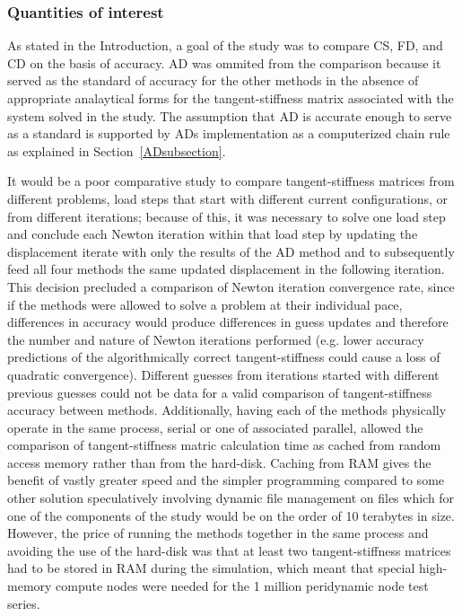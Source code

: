 \documentclass[preprint,12pt]{elsarticle}
\begin{document}
\subsubsection{Quantities of interest} 
\label{JGAM} 
As stated in the Introduction, a goal of the study was to compare CS, FD, and CD on the basis of accuracy. AD was ommited from the comparison because it served as the standard of accuracy for the other methods in the absence of appropriate analaytical forms for the tangent-stiffness matrix associated with the system solved in the study. The assumption that AD is accurate enough to serve as a standard is supported by ADs implementation as a computerized chain rule as explained in Section~\ref{ADsubsection}.

It would be a poor comparative study to compare tangent-stiffness matrices from different problems, load steps that start with different current configurations, or from different iterations; because of this, it was necessary to solve one
load step and conclude each Newton iteration within that load step by updating the displacement iterate with only the results of the AD method and to subsequently feed all four methods the same updated displacement in the following iteration. This decision precluded a comparison of Newton iteration convergence rate, since if the methods were allowed to solve a problem at their individual pace, differences in accuracy would produce differences in guess updates and therefore the number and nature of Newton iterations performed (e.g. lower accuracy predictions of the algorithmically correct tangent-stiffness could cause a loss of quadratic convergence).  Different guesses from iterations started with different previous guesses could not be data for a valid comparison of tangent-stiffness accuracy between methods.  Additionally, having each of the methods physically operate in the same process, serial or one of associated parallel, allowed the comparison of tangent-stiffness matric calculation time as cached from random access memory rather than from the hard-disk.  Caching from RAM gives the benefit of vastly greater speed and the simpler programming compared to some other solution speculatively involving dynamic file management on files which for one of the components of the study would be on the order of 10 terabytes in size. However, the price of running the methods together in the same process and avoiding the use of the hard-disk was that at least two tangent-stiffness matrices had to be stored in RAM during the simulation, which meant that special high-memory compute nodes were needed for the 1 million peridynamic node test series.
\end{document}
